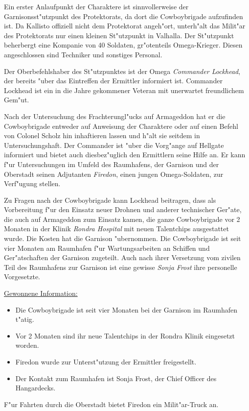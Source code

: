 
Ein erster Anlaufpunkt der Charaktere ist sinnvollerweise der Garnisonsst"utzpunkt des Protektorats, da dort die Cowboybrigade aufzufinden ist. Da Kallisto offiziell nicht dem Protektorat angeh"ort, unterh"alt das Milit"ar des Protektorats nur einen kleinen St"utzpunkt in Valhalla. Der St"utzpunkt beherbergt eine Kompanie von 40 Soldaten, gr"o\3tenteils Omega-Krieger. Diesen angeschlossen sind Techniker und sonstiges Personal.

Der Oberbefehlshaber des St"utzpunktes ist der Omega \emph{Commander Lockhead}, der bereits "uber das Eintreffen der Ermittler informiert ist. Commander Lockhead ist ein in die Jahre gekommener Veteran mit unerwartet freundlichem Gem"ut.

Nach der Untersuchung des Frachterungl"ucks auf Armageddon hat er die Cowboybrigade entweder auf Anweisung der Charaktere oder auf einen Befehl von Colonel Scholz hin inhaftieren lassen und h"alt sie seitdem in Untersuchungshaft. Der Commander ist "uber die Vorg"ange auf Hellgate informiert und bietet auch diesbez"uglich den Ermittlern seine Hilfe an. Er kann f"ur Untersuchungen im Umfeld des Raumhafens, der Garnison und der Oberstadt seinen Adjutanten \emph{Firedon}, einen jungen Omega-Soldaten, zur Verf"ugung stellen.

Zu Fragen nach der Cowboybrigade kann Lockhead beitragen, dass als Vorbereitung f"ur den Einsatz neuer Drohnen und anderer technischer Ger"ate, die auch auf Armageddon zum Einsatz kamen, die ganze Cowboybrigade vor 2 Monaten in der Klinik \emph{Rondra Hospital} mit neuen Talentchips ausgestattet wurde. Die Kosten hat die Garnison "ubernommen. Die Cowboybrigade ist seit vier Monaten am Raumhafen f"ur Wartungsarbeiten an Schiffen und Ger"atschaften der Garnison zugeteilt. Auch nach ihrer Versetzung vom zivilen Teil des Raumhafens zur Garnison ist eine gewisse \emph{Sonja Frost} ihre personelle Vorgesetzte.

\begin{remarks}
	\underline{Gewonnene Information:}
	
	\begin{itemize}
		\item Die Cowboybrigade ist seit vier Monaten bei der Garnison im Raumhafen t"atig. 
		\item Vor 2 Monaten sind ihr neue Talentchips in der Rondra Klinik eingesetzt worden.
		\item Firedon wurde zur Unterst"utzung der Ermittler freigestellt.
		\item Der Kontakt zum Raumhafen ist Sonja Frost, der Chief Officer des Hangardecks.
	\end{itemize}

	F"ur Fahrten durch die Oberstadt bietet Firedon ein Milit"ar-Truck an.
	 
\end{remarks}

